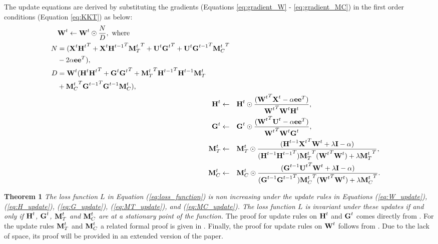 The update equations are derived by substituting the gradients (Equations \ref{eq:gradient_W} - \ref{eq:gradient_MC}) 
in the first order conditions (Equation \ref{eq:KKT}) as below:
\begin{align}
\begin{split}
&\textbf{W}^t \gets \textbf{W}^t \odot \frac{N}{D}, \text{ where } \label{eq:W_update}\\
N &= (\textbf{X}^t{\textbf{H}^t}^{T}+\textbf{X}^t{\textbf{H}^{t-1}}^{T}{\textbf{M}^t_T}^{T} + \textbf{U}^t{\textbf{G}^t}^{T}+\textbf{U}^t{\textbf{G}^{t-1}}^{T}{\textbf{M}^t_C}^{T} \\
	&- 2\alpha\textbf{e}{\textbf{e}}^{T}),\\
D &= \textbf{W}^t(\textbf{H}^t{\textbf{H}^t}^{T} + \textbf{G}^t{\textbf{G}^t}^{T} + {\textbf{M}^t_T}^{T}{\textbf{H}^{t-1}}^{T}\textbf{H}^{t-1}\textbf{M}^t_T \\
	& + {\textbf{M}^t_C}^{T}{\textbf{G}^{t-1}}^{T}\textbf{G}^{t-1}\textbf{M}^t_C), \\ 
\end{split} \\
\textbf{H}^t \gets &\quad \textbf{H}^t \odot \frac{({\textbf{W}^t}^{T}\textbf{X}^t-\alpha\textbf{e}{\textbf{e}}^{T})}{{\textbf{W}^t}^{T}\textbf{W}^t\textbf{H}^t}, \label{eq:H_update}\\
\textbf{G}^t \gets &\quad \textbf{G}^t \odot \frac{({\textbf{W}^t}^{T}\textbf{U}^t-\alpha\textbf{e}{\textbf{e}}^{T})}{{\textbf{W}^t}^{T}\textbf{W}^t\textbf{G}^t}, \label{eq:G_update}\\
\textbf{M}^t_T \gets &\quad \textbf{M}^t_T \odot \frac{(\textbf{H}^{t-1}{\textbf{X}^t}^{T}\textbf{W}^t+\lambda\textbf{I} - \alpha)}{(\textbf{H}^{t-1}{\textbf{H}^{t-1}}^{T}){\textbf{M}^t_T}^{T}({\textbf{W}^t}^{T}\textbf{W}^t) + \lambda {\textbf{M}^t_T}^{T}}, \label{eq:MT_update}\\
\textbf{M}^t_C \gets &\quad \textbf{M}^t_C \odot \frac{(\textbf{G}^{t-1}{\textbf{U}^t}^{T}\textbf{W}^t+\lambda\textbf{I} - \alpha)}{(\textbf{G}^{t-1}{\textbf{G}^{t-1}}^{T}){\textbf{M}^t_C}^{T}({\textbf{W}^t}^{T}\textbf{W}^t) + \lambda {\textbf{M}^t_C}^{T}} \label{eq:MC_update}.
\end{align}

 \textbf{Theorem 1} \emph{The loss function $L$ in Equation  (\ref{eq:loss_function}) is non increasing under the update rules in Equations (\ref{eq:W_update}),  (\ref{eq:H_update}), (\ref{eq:G_update}), (\ref{eq:MT_update}), and (\ref{eq:MC_update}).  The loss function $L$ is invariant under these updates if and only if  $\textbf{H}^t$, $\textbf{G}^t$,  $\textbf{M}^t_T$ and $\textbf{M}^t_C$ are at a stationary point of the function.} The proof for update rules on $\textbf{H}^t$ and $\textbf{G}^t$ comes directly from \cite{Lee:Nature}.  For the update rules $\textbf{M}^t_T$ and $\textbf{M}^t_C$ a related formal proof is given in \cite{Vaca:2014}.  Finally, the proof for update rules on $\textbf{W}^t$ follows from \cite{Lee:Nature}. Due to the lack of space, its proof will be provided in an extended version of the paper.
\vspace{-0.1cm}
